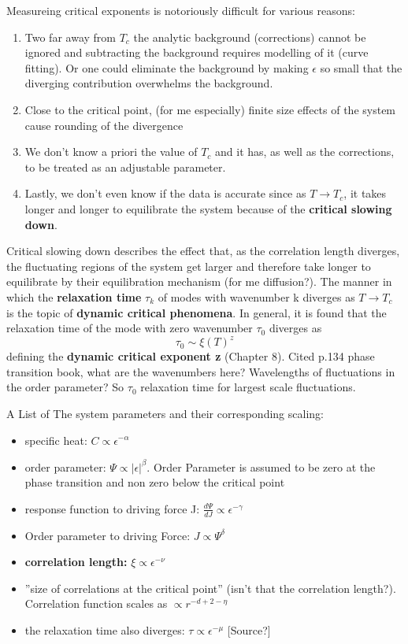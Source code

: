 	Measureing critical exponents is notoriously difficult for various reasons:
	\begin{enumerate}
		\item Two far away from $T_c$ the analytic background	(corrections) cannot be ignored and subtracting the background requires modelling of it (curve fitting). Or one could eliminate the background by making $\epsilon$ so small that the diverging contribution overwhelms the background.
		\item Close to the critical point, (for me especially) finite size effects of the system cause rounding of the divergence
		\item We don't know a priori the value of $T_c$ and it has, as well as the corrections, to be treated as an adjustable parameter.
		\item Lastly, we don't even know if the data is accurate since as $T \rightarrow T_c$, it takes longer and longer to equilibrate the system because of the \textbf{critical slowing down}.
	\end{enumerate}
	Critical slowing down describes the effect that, as the correlation length diverges, the fluctuating regions of the system get larger and therefore take longer to equilibrate by their equilibration mechanism (for me diffusion?). The manner in which the \textbf{relaxation time} $\tau_k$ of modes with wavenumber k diverges as $T \rightarrow T_c$ is the topic of \textbf{dynamic critical phenomena}. In general, it is found that the relaxation time of the mode with zero wavenumber $\tau_0$ diverges as
	\begin{equation}
		\tau_0 \sim \xi(T)^z
	\end{equation}
	defining the \textbf{dynamic critical exponent z} (Chapter 8). Cited p.134 phase transition book, what are the wavenumbers here? Wavelengths of fluctuations in the order parameter? So $\tau_0$ relaxation time for largest scale fluctuations.
	
	A List of The system parameters and their corresponding scaling:
	
	\begin{itemize}
		\item specific heat: $C \propto \epsilon^{-\alpha}$
		\item order parameter: $\Psi \propto |\epsilon|^\beta$. Order Parameter is assumed to be zero at the phase transition and non zero below the critical point
		\item response function to driving force J: $\frac{d\Psi}{dJ} \propto	\epsilon^{-\gamma}$
		\item Order parameter to driving Force: $J\propto \Psi^\delta$
		\item \textbf{correlation length:} $\xi \propto \epsilon^{-\nu}$
		\item ''size of correlations at the critical point'' (isn't that the correlation length?). Correlation function scales as $ \propto r^{-d + 2 -\eta}$
		\item the relaxation time also diverges:  $\tau \propto \epsilon^{-\mu}$ [Source?]
	\end{itemize}
	
